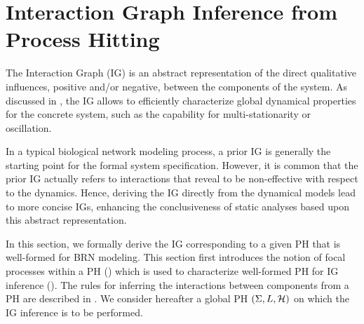 \section{Interaction Graph Inference from Process Hitting}\label{sec:infer-IG}


The Interaction Graph (IG) is an abstract representation of the direct qualitative influences,
positive and/or negative, between the components of the system.
As discussed in , the IG allows to efficiently characterize global dynamical
properties for the concrete system, such as the capability for multi-stationarity or oscillation.


In a typical biological network modeling process, a prior IG is generally the starting point for
the formal system specification.
However, it is common that the prior IG actually refers to interactions that reveal to be 
non-effective with respect to the dynamics.
Hence, deriving the IG directly from the dynamical models lead to more concise IGs, enhancing the
conclusiveness of static analyses based upon this abstract representation.

In this section, we formally derive the IG corresponding to a given PH that is well-formed for BRN
modeling.
This section first introduces the notion of focal processes within a PH ()
which is used to characterize well-formed PH for IG inference ().
The rules for inferring the interactions between components from a PH are
described in .
We consider hereafter a global PH $(\Sigma,L,\mathcal{H})$ on which the IG inference is to be
performed.



